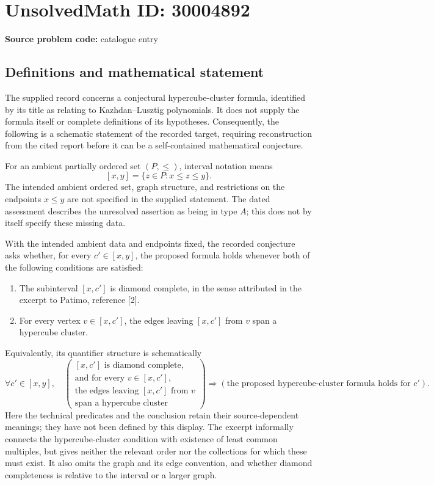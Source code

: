 \documentclass[11pt]{article}
\begin{document}
\section*{UnsolvedMath ID: 30004892}
\textbf{Source problem code:} catalogue entry
\subsection{Definitions and mathematical statement}
The supplied record concerns a conjectural hypercube-cluster formula, identified by its title as relating to Kazhdan--Lusztig polynomials. It does not supply the formula itself or complete definitions of its hypotheses. Consequently, the following is a schematic statement of the recorded target, requiring reconstruction from the cited report before it can be a self-contained mathematical conjecture.

For an ambient partially ordered set \((P,\leq)\), interval notation means
\[
[x,y]=\{z\in P:x\leq z\leq y\}.
\]
The intended ambient ordered set, graph structure, and restrictions on the endpoints \(x\leq y\) are not specified in the supplied statement. The dated assessment describes the unresolved assertion as being in type \(A\); this does not by itself specify these missing data.

With the intended ambient data and endpoints fixed, the recorded conjecture asks whether, for every \(c'\in[x,y]\), the proposed formula holds whenever both of the following conditions are satisfied:
\begin{enumerate}
\item The subinterval \([x,c']\) is diamond complete, in the sense attributed in the excerpt to Patimo, reference [2].
\item For every vertex \(v\in[x,c']\), the edges leaving \([x,c']\) from \(v\) span a hypercube cluster.
\end{enumerate}
Equivalently, its quantifier structure is schematically
\[
\forall c'\in[x,y],\quad
\left(
\begin{gathered}
[x,c']\text{ is diamond complete},\\
\text{and for every }v\in[x,c'],\\
\text{the edges leaving }[x,c']\text{ from }v\\
\text{span a hypercube cluster}
\end{gathered}
\right)
\Longrightarrow
\left(\text{the proposed hypercube-cluster formula holds for }c'\right).
\]
Here the technical predicates and the conclusion retain their source-dependent meanings; they have not been defined by this display. The excerpt informally connects the hypercube-cluster condition with existence of least common multiples, but gives neither the relevant order nor the collections for which these must exist. It also omits the graph and its edge convention, and whether diamond completeness is relative to the interval or a larger graph.
\end{document}
